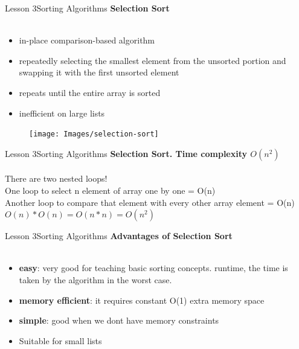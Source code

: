 \documentclass[aspectratio=1610]{beamer}
\begin{document}
\begin{frame}{Lesson 3}{Sorting Algorithms}
\LARGE
\textbf{Selection Sort}\\~\\
\begin{minipage}{0.65\textwidth}
\Large
\begin{itemize}
    \item in-place comparison-based algorithm
    \item repeatedly selecting the smallest element from the unsorted portion and swapping it with the first unsorted element
    \item repeats until the entire array is sorted
    \item inefficient on large lists
\end{itemize}
  \end{minipage}
\begin{minipage}{.0\textwidth}
      \begin{figure}
        \texttt{[image: Images/selection-sort]}
      \end{figure}
  \end{minipage}  
\end{frame}


\begin{frame}{Lesson 3}{Sorting Algorithms}
\LARGE
\textbf{Selection Sort. Time complexity $O(n^2)$}\\~\\
There are two nested loops!\\
One loop to select n element of array one by one = O(n)\\
Another loop to compare that element with every other array element = O(n)\\
$O(n) * O(n) = O(n*n) = O(n^2)$
\end{frame}



\begin{frame}{Lesson 3}{Sorting Algorithms}
\LARGE
\textbf{Advantages of Selection Sort}\\~\\
\Large
\begin{itemize}
	\item \textbf{easy}: very good for teaching basic sorting concepts.
 runtime, the time is taken by the algorithm in the worst case.
	\item \textbf{memory efficient}: it requires constant O(1) extra memory space
	\item \textbf{simple}: good when we dont have memory constraints
	\item Suitable for small lists
\end{itemize}

\end{frame}
\end{document}
